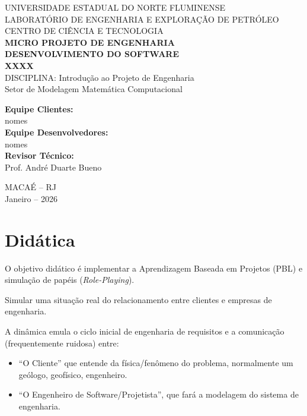 \documentclass[12pt,a4paper]{article}
\begin{document}
\begin{titlepage}
  \centering
  {\large UNIVERSIDADE ESTADUAL DO NORTE FLUMINENSE}\\[0.3cm]
  {\large LABORATÓRIO DE ENGENHARIA E EXPLORAÇÃO DE PETRÓLEO}\\[0.3cm]
  {\large CENTRO DE CIÊNCIA E TECNOLOGIA}\\[1.5cm]
  {\Large \textbf{MICRO PROJETO DE ENGENHARIA}}\\[0.5cm]
  {\Large \textbf{DESENVOLVIMENTO DO SOFTWARE}}\\[0.5cm]
  {\Large \textbf{XXXX}}\\[1.5cm]
  {\normalsize DISCIPLINA: Introdução ao Projeto de Engenharia}\\[0.3cm]
  {\normalsize Setor de Modelagem Matemática Computacional}\\[1.5cm]
  \begin{flushleft}
    \textbf{Equipe Clientes:}\\
    nomes\\[0.8cm]
    \textbf{Equipe Desenvolvedores:}\\
    nomes\\[0.8cm]
    \textbf{Revisor Técnico:}\\
    Prof. André Duarte Bueno
  \end{flushleft}
  \vfill
  {\normalsize MACAÉ -- RJ}\\[0.2cm]
  {\normalsize Janeiro -- 2026}
\end{titlepage}

\section*{Didática}

O objetivo didático é implementar a Aprendizagem Baseada em Projetos (PBL) e simulação de papéis (\textit{Role-Playing}).

Simular uma situação real do relacionamento entre clientes e empresas de engenharia.

A dinâmica emula o ciclo inicial de engenharia de requisitos e a comunicação (frequentemente ruidosa) entre:
\begin{itemize}
  \item ``O Cliente'' que entende da física/fenômeno do problema, normalmente um geólogo, geofísico, engenheiro.
  \item ``O Engenheiro de Software/Projetista'', que fará a modelagem do sistema de engenharia.
\end{itemize}
\end{document}
